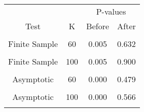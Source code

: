 \begin{table}[!h]
\centering
\begin{tabular}{cccc}
\toprule
\multicolumn{1}{c}{ } & \multicolumn{1}{c}{ } & \multicolumn{2}{c}{P-values} \\
\cmidrule(l{3pt}r{3pt}){3-4}
Test & K & Before & After\\
\midrule
\cellcolor{gray!6}{Finite Sample} & \cellcolor{gray!6}{40} & \cellcolor{gray!6}{0.005} & \cellcolor{gray!6}{0.876}\\
Finite Sample & 60 & 0.005 & 0.632\\
\cellcolor{gray!6}{Finite Sample} & \cellcolor{gray!6}{80} & \cellcolor{gray!6}{0.005} & \cellcolor{gray!6}{0.806}\\
Finite Sample & 100 & 0.005 & 0.900\\
\cellcolor{gray!6}{Asymptotic} & \cellcolor{gray!6}{40} & \cellcolor{gray!6}{0.000} & \cellcolor{gray!6}{0.223}\\
\addlinespace
Asymptotic & 60 & 0.000 & 0.479\\
\cellcolor{gray!6}{Asymptotic} & \cellcolor{gray!6}{80} & \cellcolor{gray!6}{0.000} & \cellcolor{gray!6}{0.634}\\
Asymptotic & 100 & 0.000 & 0.566\\
\cellcolor{gray!6}{ECE} & \cellcolor{gray!6}{} & \cellcolor{gray!6}{0.195} & \cellcolor{gray!6}{0.114}\\
\bottomrule
\end{tabular}
\end{table}
